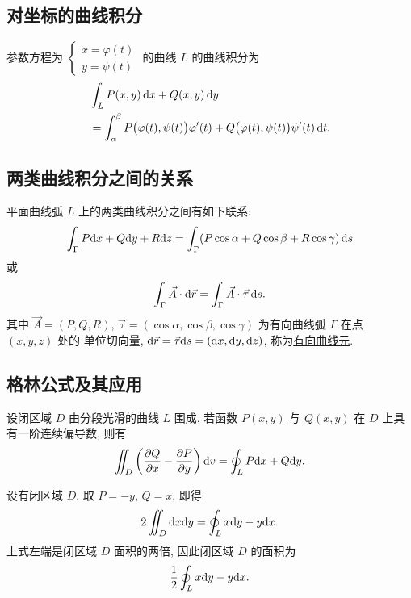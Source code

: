 \documentclass[a4paper,10pt,fleqn]{article}
\newcommand{\pdif}[2]{\frac{\partial #1}{\partial #2}}
\begin{document}
\subsection{对坐标的曲线积分}

\begin{thm}
    参数方程为 $\begin{cases}x=\varphi(t)\\y=\psi(t)\end{cases}$ 的曲线 $L$ 的曲线积分为
    \begin{align*}
         & \int_LP(x,y)\,{\rm d}x+Q(x,y)\,{\rm d}y                                                                      \\
         & =\int_\alpha^\beta P\big(\varphi(t),\psi(t)\big)\varphi'(t)+Q\big(\varphi(t),\psi(t)\big)\psi'(t)\,{\rm d}t.
    \end{align*}
\end{thm}

\subsection*{两类曲线积分之间的关系}

平面曲线弧 $L$ 上的两类曲线积分之间有如下联系:
\[
    \int_\Gamma P{\rm d}x+Q{\rm d}y+R{\rm d}z=\int_\Gamma(P\cos\alpha+Q\cos\beta+R\cos\gamma)\,{\rm d}s
\]
或
\[
    \int_\Gamma\vec{A}\cdot{\rm d}\vec{r}=\int_\Gamma\vec{A}\cdot\vec{\tau}\,{\rm d}s.
\]
其中 $\vec{A}=(P,Q,R)$, $\vec{\tau}=(\cos\alpha,\cos\beta,\cos\gamma)$ 为有向曲线弧 $\Gamma$ 在点 $(x,y,z)$ 处的
单位切向量, ${\rm d}\vec{r}=\vec{\tau}{\rm d}s=({\rm d}x,{\rm d}y,{\rm d}z)$, 称为\uline{有向曲线元}.

\subsection{格林公式及其应用}

\begin{thm}[格林公式]
    设闭区域 $D$ 由分段光滑的曲线 $L$ 围成, 若函数 $P(x,y)$ 与 $Q(x,y)$ 在 $D$ 上具有一阶连续偏导数, 则有
    \[
        \iint_D\left(\pdif{Q}{x}-\pdif{P}{y}\right){\rm d}v=\oint_LP{\rm d}x+Q{\rm d}y.
    \]
\end{thm}

\begin{attn}
    设有闭区域 $D$. 取 $P=-y$, $Q=x$, 即得
    \[
        2\iint_D{\rm d}x{\rm d}y=\oint_Lx{\rm d}y-y{\rm d}x.
    \]
    上式左端是闭区域 $D$ 面积的两倍, 因此闭区域 $D$ 的面积为
    \[
        \frac{1}{2}\oint_Lx{\rm d}y-y{\rm d}x.
    \]
\end{attn}
\end{document}
